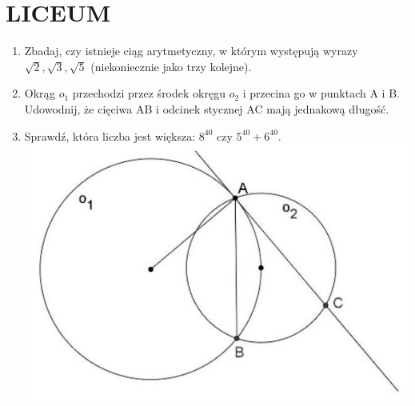 \documentclass[10pt]{article}
\begin{document}
\section*{LICEUM}
\begin{enumerate}
  \item Zbadaj, czy istnieje ciąg arytmetyczny, w którym występują wyrazy \(\sqrt{2}, \sqrt{3}, \sqrt{5}\) (niekoniecznie jako trzy kolejne).
  \item Okrąg \(o_{1}\) przechodzi przez środek okręgu \(o_{2}\) i przecina go w punktach A i B. Udowodnij, że cięciwa AB i odcinek stycznej AC mają jednakową długość.
  \item Sprawdź, która liczba jest większa: \(8^{40}\) czy \(5^{40}+6^{40}\).\\
\includegraphics[max width=\textwidth, center]{2024_11_21_92e4b017f3ebdb44cbd9g-1(1)}
\end{enumerate}
\end{document}

